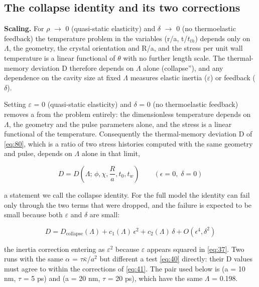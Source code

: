\documentclass[preprint,12pt]{elsarticle}
\begin{document}
\subsection{The collapse identity and its two corrections}
\label{sec:3.2}

\textbf{Scaling.} For $\rho$ $\to$ 0 (quasi-static elasticity) and $\delta$ $\to$ 0 (no thermoelastic feedback) the temperature problem in the variables (r/a, t/$t_{th}$) depends only on $\Lambda$, the geometry, the crystal orientation and R/a, and the stress per unit wall temperature is a linear functional of $\theta$ with no further length scale. The thermal-memory deviation D therefore depends on $\Lambda$ alone (collapse''), and any dependence on the cavity size at fixed $\Lambda$ measures elastic inertia ($\varepsilon$) or feedback ($\delta$).

Setting $\varepsilon$ = 0 (quasi-static elasticity) and $\delta$ = 0 (no thermoelastic feedback) removes a from the problem entirely: the dimensionless temperature depends on $\Lambda$, the geometry and the pulse parameters alone, and the stress is a linear functional of the temperature. Consequently the thermal-memory deviation D of \eqref{eq:80}, which is a ratio of two stress histories computed with the same geometry and pulse, depends on $\Lambda$ alone in that limit,

\begin{equation}
D=D\left(\Lambda;\,\phi,\chi,\frac{R}{a},t_0,t_w\right)\qquad (\epsilon=0,\;\delta=0) 
\label{eq:40}
\end{equation}

a statement we call the collapse identity. For the full model the identity can fail only through the two terms that were dropped, and the failure is expected to be small because both $\varepsilon$ and $\delta$ are small:

\begin{equation}
D=D_{\mathrm{collapse}}(\Lambda)+c_1(\Lambda)\,\epsilon^{2}+c_2(\Lambda)\,\delta+O(\epsilon^4,\delta^2) 
\label{eq:41}
\end{equation}

the inertia correction entering as $\varepsilon^{2}$ because $\varepsilon$ appears squared in \eqref{eq:37}. Two runs with the same $\alpha$ = $\tau \bar{\kappa}$/$a^{2}$ but different a test \eqref{eq:40} directly: their D values must agree to within the corrections of \eqref{eq:41}. The pair used below is (a = 10 nm, $\tau$ = 5 ps) and (a = 20 nm, $\tau$ = 20 ps), which have the same $\Lambda$ = 0.198.
\end{document}
